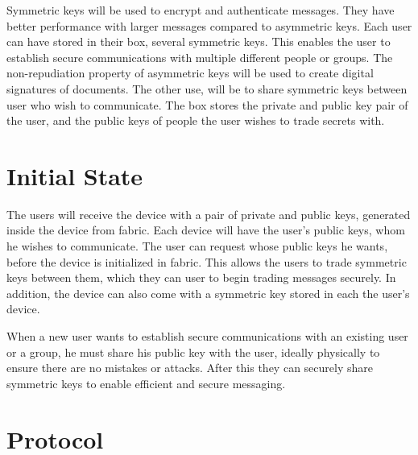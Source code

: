 \cleardoublepage
\label{chap:solution}

Symmetric keys will be used to encrypt and authenticate messages. They have better performance with larger messages compared to asymmetric keys. Each user can have stored in their box, several symmetric keys. This enables the user to establish secure communications with multiple different people or groups.
The non-repudiation property of asymmetric keys will be used to create digital signatures of documents. The other use, will be to share symmetric keys between user who wish to communicate. The box stores the private and public key pair of the user, and the public keys of people the user wishes to trade secrets with.

\section{Initial State} \label{chap:sol:initial-state}

The users will receive the device with a pair of private and public keys, generated inside the device from fabric. Each device will have the user's public keys, whom he wishes to communicate. The user can request whose public keys he wants, before the device is initialized in fabric. This allows the users to trade symmetric keys between them, which they can user to begin trading messages securely. In addition, the device can also come with a symmetric key stored in each the user's device.

When a new user wants to establish secure communications with an existing user or a group, he must share his public key with the user, ideally physically to ensure there are no mistakes or attacks. After this they can securely share symmetric keys to enable efficient and secure messaging.

\section{Protocol} \label{chap:sol:protocol}

